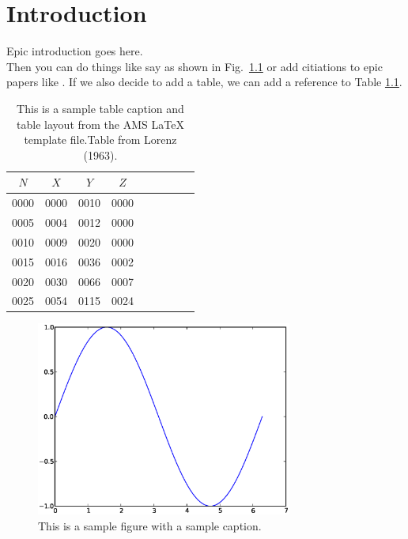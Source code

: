 \chapter{Introduction}
Epic introduction goes here.\\

Then you can do things like say as shown in Fig.\ \ref{fig:sample}
or add citiations to epic papers like \cite{eliassen1951}. If we also decide
to add a table, we can add a reference to Table \ref{tab:lorenz}.

\begin{table}[t]
\caption[This caption appears in the LoT]{This is a sample table caption and
  table layout from the AMS LaTeX template file.Table from Lorenz (1963).}
\label{tab:lorenz}
\begin{center}
\begin{tabular}{ccccrrcrc}
\hline\hline
$N$ & $X$ & $Y$ & $Z$\\
\hline
 0000 & 0000 & 0010 & 0000 \\
 0005 & 0004 & 0012 & 0000 \\
 0010 & 0009 & 0020 & 0000 \\
 0015 & 0016 & 0036 & 0002 \\
 0020 & 0030 & 0066 & 0007 \\
 0025 & 0054 & 0115 & 0024 \\
\hline
\end{tabular}
\end{center}
\end{table}

\begin{figure}[H]
    \centering
    \includegraphics[width=0.75\textwidth]{./chap1/fig/sample_fig}
    \caption[This caption is only in the LoF]{This is a sample figure with a
    sample caption.}
    \label{fig:sample}
\end{figure}
